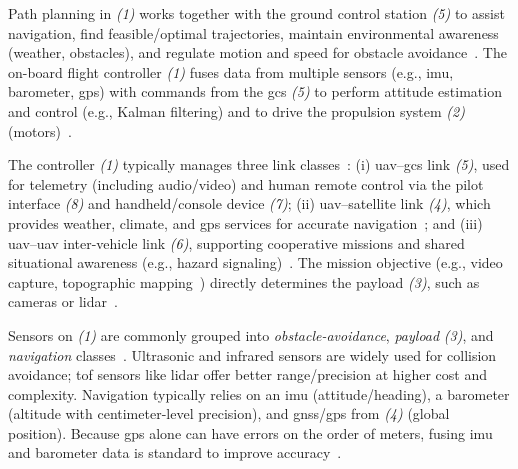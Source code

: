 Path planning in \emph{(1)} works together with the ground control station \emph{(5)} to assist navigation, 
find feasible/optimal trajectories, maintain environmental awareness (weather, obstacles), and regulate motion and speed for obstacle avoidance~\cite{aggarwal2020UAVPathPlanning}. 
The on-board flight controller \emph{(1)} fuses data from multiple sensors (e.g., \gls{imu}, barometer, \gls{gps}) with 
commands from the \gls{gcs} \emph{(5)} to perform attitude estimation and control (e.g., Kalman filtering) and to drive the propulsion system \emph{(2)} (motors)~\cite{px4-sysArch}.

The controller \emph{(1)} typically manages three link classes~\cite{aggarwal2020UAVPathPlanning}: 
(i) \gls{uav}–\gls{gcs} link \emph{(5)}, used for telemetry (including audio/video) and human remote control via the pilot interface \emph{(8)} and handheld/console device \emph{(7)}; 
(ii) \gls{uav}–satellite link \emph{(4)}, which provides weather, climate, and \gls{gps} services for accurate navigation~\cite{liang_toward_2024,alvarez-vanhard_uav_2021}; and 
(iii) \gls{uav}–\gls{uav} inter-vehicle link \emph{(6)}, supporting cooperative missions and shared situational awareness (e.g., hazard signaling)~\cite{li_distributed_2024,azari_uav--uav_2020}.
The mission objective (e.g., video capture, topographic mapping~\cite{caroti_uav-borne_2017}) directly determines the payload \emph{(3)}, such as cameras or \gls{lidar}~\cite{cai_branch_2024}.

Sensors on \emph{(1)} are commonly grouped into \emph{obstacle-avoidance}, \emph{payload} \emph{(3)}, and \emph{navigation} classes~\cite{VogeltanzFreeSWUAVSurvey2016}. 
Ultrasonic and infrared sensors are widely used for collision avoidance; \gls{tof} sensors like \gls{lidar} offer better range/precision at higher cost and complexity. 
Navigation typically relies on an \gls{imu} (attitude/heading), a barometer (altitude with centimeter-level precision), and \gls{gnss}/\gls{gps} from \emph{(4)} (global position). 
Because \gls{gps} alone can have errors on the order of meters, fusing \gls{imu} and barometer data is standard to improve accuracy~\cite{ebeidUAVPlatformsSurvey2017}.

